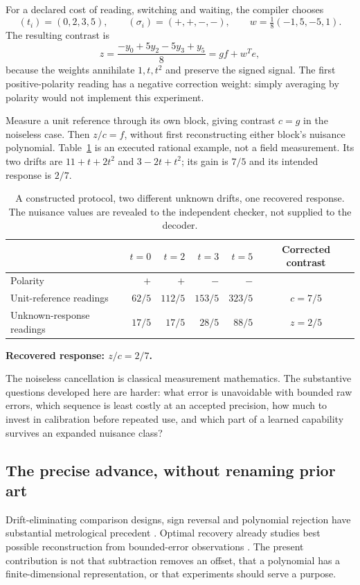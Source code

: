 \documentclass[11pt,letterpaper]{article}
\theoremstyle{definition}\newtheorem{definition}[theorem]{Definition}
\theoremstyle{remark}\newtheorem{remark}[theorem]{Remark}
\begin{document}
For a declared cost of reading, switching and waiting, the compiler chooses
\begin{equation}
 (t_i)=(0,2,3,5),\qquad(\sigma_i)=(+,+,-,-),\qquad
 w=\tfrac18(-1,5,-5,1).
 \label{eq:primaryword}
\end{equation}
The resulting contrast is
\begin{equation}
 z=\frac{-y_0+5y_2-5y_3+y_5}{8}=gf+w^Te,
 \label{eq:openingcontrast}
\end{equation}
because the weights annihilate $1,t,t^2$ and preserve the signed signal. The first positive-polarity reading has a negative correction weight: simply averaging by polarity would not implement this experiment.

Measure a unit reference through its own block, giving contrast $c=g$ in the noiseless case. Then $z/c=f$, without first reconstructing either block's nuisance polynomial. Table~\ref{tab:opening} is an executed rational example, not a field measurement. Its two drifts are $11+t+2t^2$ and $3-2t+t^2$; its gain is $7/5$ and its intended response is $2/7$.

\begin{table}[htbp]\centering\small
\caption{A constructed protocol, two different unknown drifts, one recovered response. The nuisance values are revealed to the independent checker, not supplied to the decoder.}
\begin{tabular}{@{}lrrrrc@{}}\toprule
 & $t=0$ & $t=2$ & $t=3$ & $t=5$ & Corrected contrast\\\midrule
Polarity & $+$ & $+$ & $-$ & $-$ & \\
Unit-reference readings & $62/5$ & $112/5$ & $153/5$ & $323/5$ & $c=7/5$\\
Unknown-response readings & $17/5$ & $17/5$ & $28/5$ & $88/5$ & $z=2/5$\\\bottomrule
\end{tabular}\par\smallskip
\textbf{Recovered response: $z/c=2/7$.}
\label{tab:opening}
\end{table}

The noiseless cancellation is classical measurement mathematics. The substantive questions developed here are harder: what error is unavoidable with bounded raw errors, which sequence is least costly at an accepted precision, how much to invest in calibration before repeated use, and which part of a learned capability survives an expanded nuisance class?

\subsection{The precise advance, without renaming prior art}
Drift-eliminating comparison designs, sign reversal and polynomial rejection have substantial metrological precedent \cite{doiron,swanson}. Optimal recovery already studies best possible reconstruction from bounded-error observations \cite{ettehad}. The present contribution is not that subtraction removes an offset, that a polynomial has a finite-dimensional representation, or that experiments should serve a purpose.
\end{document}
